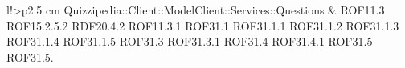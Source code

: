 \begin{tabella}{l!{\VRule}>{\centering\arraybackslash}p{2.5 cm}}
Quizzipedia::Client::ModelClient::Services::Questions & ROF11.3 \linebreak ROF15.2.5.2 \linebreak RDF20.4.2 \linebreak ROF11.3.1 \linebreak ROF31.1 \linebreak ROF31.1.1 \linebreak ROF31.1.2 \linebreak ROF31.1.3 \linebreak ROF31.1.4 \linebreak ROF31.1.5 \linebreak ROF31.3 \linebreak ROF31.3.1 \linebreak ROF31.4 \linebreak ROF31.4.1 \linebreak ROF31.5 \linebreak ROF31.5.
\end{tabella}

